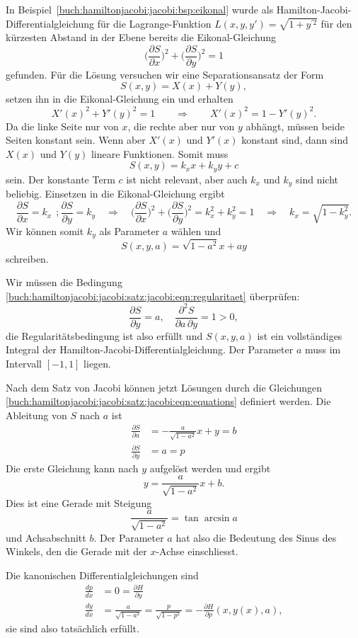 \begin{beispiel}
In Beispiel~\ref{buch:hamiltonjacobi:jacobi:bsp:eikonal} wurde als
Hamilton-Jacobi-Differentialgleichung für die Lagrange-Funktion
$L(x,y,y')=\sqrt{1+y^{\prime 2}}$ für den kürzesten Abstand in der
Ebene bereits die Eikonal-Gleichung
\[
\biggl(\frac{\partial S}{\partial x}\biggr)^2
+
\biggl(\frac{\partial S}{\partial y}\biggr)^2
=
1
\]
gefunden.
Für die Lösung versuchen wir eine Separationsansatz der Form
\[
S(x,y) = X(x) + Y(y),
\]
setzen ihn in die Eikonal-Gleichung ein und erhalten
\[
X'(x)^2 + Y'(y)^2 = 1
\qquad\Rightarrow\qquad
X'(x)^2 = 1 - Y'(y)^2.
\]
Da die linke Seite nur von $x$, die rechte aber nur von $y$ abhängt,
müssen beide Seiten konstant sein.
Wenn aber $X'(x)$ und $Y'(x)$ konstant sind, dann sind $X(x)$ und $Y(y)$
lineare Funktionen.
Somit muss
\[
S(x,y) = k_xx + k_yy + c
\]
sein.
Der konstante Term $c$ ist nicht relevant, aber auch $k_x$ und $k_y$ sind
nicht beliebig.
Einsetzen in die Eikonal-Gleichung ergibt
\[
\frac{\partial S}{\partial x} = k_x
\,\;;
\frac{\partial S}{\partial y} = k_y
\quad\Rightarrow\quad
\biggl(\frac{\partial S}{\partial x}\biggr)^2
+
\biggl(\frac{\partial S}{\partial y}\biggr)^2
=
k_x^2 + k_y^2 = 1
\quad\Rightarrow\quad
k_x = \sqrt{1-k_y^2}.
\]
Wir können somit $k_y$ als Parameter $a$ wählen und
\[
S(x,y,a)
=
\sqrt{1-a^2}x+ay
\]
schreiben.

Wir müssen die Bedingung
\eqref{buch:hamiltonjacobi:jacobi:satz:jacobi:eqn:regularitaet}
überprüfen:
\[
\frac{\partial S}{\partial y}
=
a,
\quad
\frac{\partial^2 S}{\partial a\,\partial y}
=
1
>
0,
\]
die Regularitätsbedingung ist also erfüllt und $S(x,y,a)$ ist ein
vollständiges Integral der Hamilton-Jacobi-Differentialgleichung.
Der Parameter $a$ muss im Intervall $[-1,1]$ liegen.

Nach dem Satz von Jacobi können jetzt Lösungen durch die Gleichungen
\eqref{buch:hamiltonjacobi:jacobi:satz:jacobi:eqn:equations}
definiert werden.
Die Ableitung von $S$ nach $a$ ist
\begin{align*}
\frac{\partial S}{\partial a}
&=
-
\frac{a}{\sqrt{1-a^2}}
x
+
y
=
b
\\
\frac{\partial S}{\partial y}
&=
a
=
p
\end{align*}
Die erste Gleichung kann nach $y$ aufgelöst werden und ergibt
\[
y
=
\frac{a}{\sqrt{1-a^2}} x + b.
\]
Dies ist eine Gerade mit Steigung 
\[
\frac{a}{\sqrt{1-a^2}}
=
\tan\arcsin a
\]
und Achsabschnitt $b$.
Der Parameter $a$ hat also die Bedeutung des Sinus des Winkels, den die
Gerade mit der $x$-Achse einschliesst.

Die kanonischen Differentialgleichungen sind
\begin{align*}
\frac{dp}{dx}
&=
0
=
\frac{\partial H}{\partial y}
\\
\frac{dy}{dx}
&=
\frac{a}{\sqrt{1-a^2}}
=
\frac{p}{\sqrt{1-p^2}}
=
-\frac{\partial H}{\partial p}(x,y(x),a),
\end{align*}
sie sind also tatsächlich erfüllt.
\end{beispiel}

